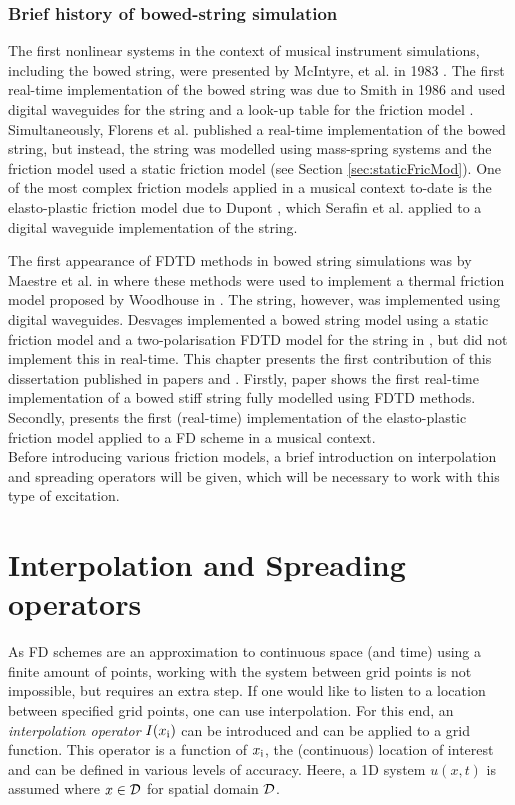 \subsubsection{Brief history of bowed-string simulation}
The first nonlinear systems in the context of musical instrument simulations, including the bowed string, were presented by McIntyre, et al. in 1983 \cite{McIntyre1983}. The first real-time implementation of the bowed string was due to Smith in 1986 and used digital waveguides for the string and a look-up table for the friction model \cite{Smith1986}. Simultaneously, Florens et al. published a real-time implementation of the bowed string, but instead, the string was modelled using mass-spring systems and the friction model used a static friction model \cite{Florens1986} (see Section \ref{sec:staticFricMod}). One of the most complex friction models applied in a musical context to-date is the elasto-plastic friction model due to Dupont \cite{Dupont2002}, which Serafin et al. \cite{Serafin2003, Serafin2004} applied to a digital waveguide implementation of the string. 

The first  appearance of FDTD methods in bowed string simulations was by Maestre et al. in \cite{Maestre2014} where these methods were used to implement a thermal friction model proposed by Woodhouse in \cite{Woodhouse2003}. The string, however, was implemented using digital waveguides. Desvages implemented a bowed string model using a static friction model and a two-polarisation FDTD model for the string in \cite{Desvages2016, Desvages2018}, but did not implement this in real-time. This chapter presents the first contribution of this dissertation published in papers \citeP[A] and \citeP[C]. Firstly, paper \citeP[A] shows the first real-time implementation of a bowed stiff string fully modelled using FDTD methods. Secondly, \citeP[C] presents the first (real-time) implementation of the elasto-plastic friction model applied to a FD scheme in a musical context.
\\

Before introducing various friction models, a brief introduction on interpolation and spreading operators will be given, which will be necessary to work with this type of excitation.

\section{Interpolation and Spreading operators}\label{sec:interpolationSpreading}
As FD schemes are an approximation to continuous space (and time) using a finite amount of points, working with the system between grid points is not impossible, but requires an extra step. If one would like to listen to a location between specified grid points, one can use interpolation. For this end, an \textit{interpolation operator} $I(x_{\text{i}})$ can be introduced and can be applied to a grid function.  This operator is a function of $x_{\text{i}}$, the (continuous) location of interest and can be defined in various levels of accuracy. Heere, a 1D system $u(x,t)$ is assumed where $x\in \mathcal{D}$ for spatial domain $\mathcal{D}$.

